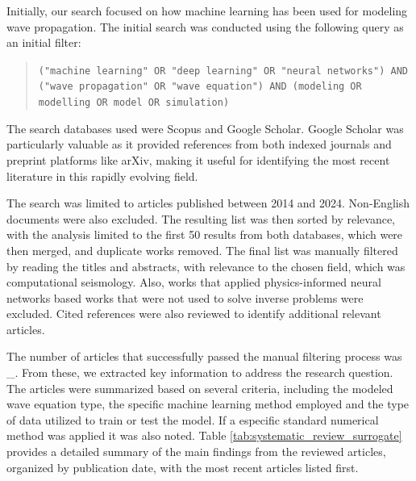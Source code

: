 \documentclass[11pt,twoside]{article}
\begin{document}
Initially, our search focused on how machine learning has been used for modeling wave propagation. The initial 
search was conducted using the following query as an initial filter: 

\vspace*{2mm}

\begin{tcolorbox}[colback=gray!20, colframe=gray!20, sharp corners]
\begin{quote}
\noindent\texttt{("machine learning" OR "deep learning" OR "neural networks") AND ("wave propagation" 
OR "wave equation") AND (modeling OR modelling OR model OR simulation)}
\end{quote}
\end{tcolorbox}

\vspace*{2mm}

The search databases used were Scopus and Google Scholar. Google Scholar was particularly valuable as it 
provided references from both indexed journals and preprint platforms like arXiv, making it useful for 
identifying the most recent literature in this rapidly evolving field.

The search was limited to articles published between 2014 and 2024. Non-English documents were also excluded. 
The resulting list was then sorted by relevance, with the analysis limited to the first 50 results from both 
databases, which were then merged, and duplicate works removed. The final list was manually filtered by 
reading the titles and abstracts, with relevance to the chosen field, which was computational seismology. 
Also, works that applied physics-informed neural networks based works that were not used to solve inverse 
problems were excluded. Cited references were also reviewed to identify additional relevant articles. 
 
The number of articles that successfully passed the manual filtering process was \_. From these, we extracted 
key information to address the research question. The articles were summarized based on several criteria, 
including the modeled wave equation type, the specific machine learning method employed and the type 
of data utilized to train or test the model. If a especific standard numerical method was applied 
it was also noted. Table \ref{tab:systematic_review_surrogate} provides a detailed summary of the main 
findings from the reviewed articles, organized by publication date, with the most recent articles listed first.
\end{document}
